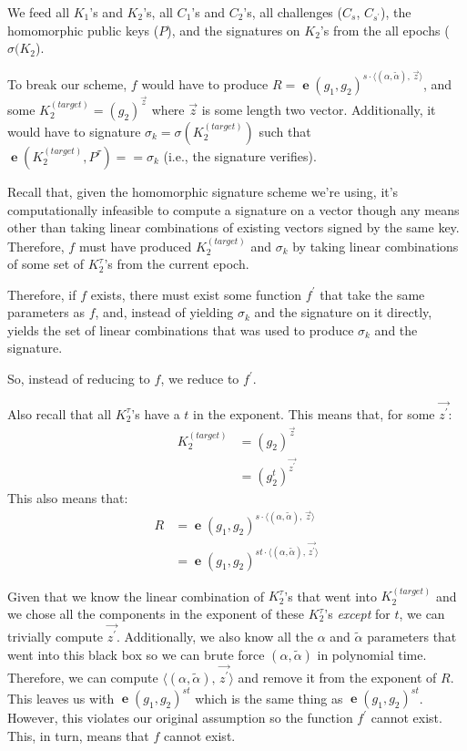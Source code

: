 \documentclass[pdftex,12pt,a4papaer,twoside,notitlepage]{report}
\DeclareMathOperator{\e}{\mathbf{e}}
\newcommand{\iprod}[2]{\langle #1,\,#2\rangle}
\begin{document}
\begin{appendices}
We feed all $K_1$'s and $K_2$'s, all $C_1$'s and $C_2$'s, all challenges ($C_s$,
$C_{s^\prime}$), the homomorphic public keys ($P$), and the signatures on
$K_2$'s from the all epochs ($\sigma(K_2$).

To break our scheme, $f$ would have to produce $R = \e(g_1, g_2)^{s \cdot
  \iprod{(\alpha, \tilde{\alpha})}{\vec{z}}}$, and some
$K^{(\mathit{target})}_{2} = (g_2)^{\vec{z}}$ where $\vec{z}$ is some length two
vector. Additionally, it would have to signature $\sigma_k =
\sigma(K^{(\mathit{target})}_2)$ such that $\e(K^{(\mathit{target})}_2, P^\tau)
== \sigma_k$ (i.e., the signature verifies).

Recall that, given the homomorphic signature scheme we're using, it's
computationally infeasible to compute a signature on a vector though any means
other than taking linear combinations of existing vectors signed by the same
key. Therefore, $f$ must have produced $K^{(\mathit{target})}_{2} $ and
$\sigma_k$ by taking linear combinations of some set of $K_2^\tau$'s from the
current epoch.

Therefore, if $f$ exists, there must exist some function $f^\prime$ that take
the same parameters as $f$, and, instead of yielding $\sigma_k$ and the
signature on it directly, yields the set of linear combinations that was used to
produce $\sigma_k$ and the signature.

So, instead of reducing to $f$, we reduce to $f^\prime$.

Also recall that all $K_2^\tau$'s have a $t$ in the exponent. This means that,
for some $\vec{z^\prime}$:
\begin{align*}
  K_2^{(\mathit{target})} &= (g_2)^{\vec{z}} \\
                     &= (g_2^t)^{\vec{z^\prime}}
\end{align*}
This also means that:
\begin{align*}
  R &= \e(g_1, g_2)^{s \cdot \iprod{(\alpha, \tilde{\alpha})}{\vec{z}}} \\
    &= \e(g_1, g_2)^{st \cdot \iprod{(\alpha, \tilde{\alpha})}{\vec{z^\prime}}}
\end{align*}

Given that we know the linear combination of $K_2^\tau$'s that went into
$K_2^{(\mathit{target})}$ and we chose all the components in the exponent of
these $K_2^\tau$'s \emph{except} for $t$, we can trivially compute
$\vec{z^\prime}$. Additionally, we also know all the $\alpha$ and
$\tilde{\alpha}$ parameters that went into this black box so we can brute force
$(\alpha, \tilde{\alpha})$ in polynomial time. Therefore, we can compute
$\iprod{(\alpha, \tilde{\alpha})}{\vec{z^\prime}}$ and remove it from the
exponent of $R$. This leaves us with $\e(g_1, g_2)^{st}$ which is the same thing
as $\e(g_1, g_2)^{st}$. However, this violates our original assumption so the
function $f^\prime$ cannot exist. This, in turn, means that $f$ cannot exist.


\end{appendices}
\end{document}
